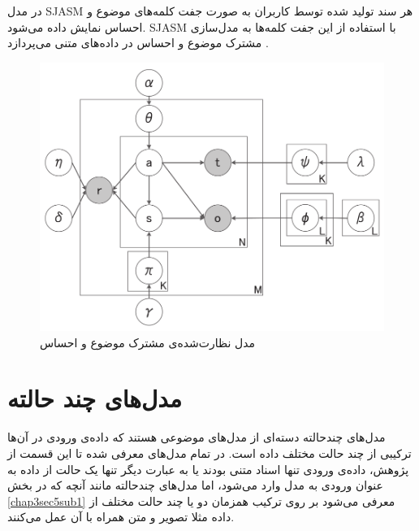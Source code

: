 در مدل 
SJASM
هر سند تولید شده توسط کاربران به صورت جفت کلمه‌های موضوع و احساس نمایش داده می‌شود. SJASM با استفاده از این جفت کلمه‌ها به مدل‌سازی مشترک موضوع و احساس در داده‌های متنی می‌پردازد
\cite{7855825}.
‌
	\begin{figure}[!t]
		\centering
		\includegraphics[scale=0.25]{chap3-img/SJASM}
		\caption{مدل نظارت‌شده‌ی مشترک موضوع و احساس \cite{7855825}}
		\label{chap3-fig13}
	\end{figure}


	
\section{مدل‌های چند حالته}
	مدل‌های چندحالته 
	دسته‌ای از مدل‌های موضوعی هستند که داده‌ی ورودی در آن‌ها ترکیبی‌ از چند حالت مختلف داده است. در تمام مدل‌های معرفی‌ شده تا این قسمت از پژوهش، داده‌ی ورودی تنها اسناد متنی بودند یا به عبارت دیگر تنها یک حالت از داده به عنوان ورودی به مدل وارد می‌‌شود، اما مدل‌های چندحالته مانند آنچه که در بخش
	\ref{chap3sec5sub1}
	معرفی‌ می‌‌شود بر روی ترکیب همزمان دو یا چند حالت مختلف از داده مثلا تصویر و متن همراه با آن عمل می‌‌کنند.

	
	
